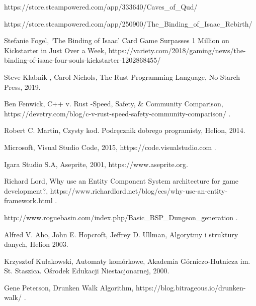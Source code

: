 \documentclass[12pt,twoside]{article}
\begin{document}
\begin{thebibliography}{4}
 https://store.steampowered.com/app/333640/Caves\_of\_Qud/


 https://store.steampowered.com/app/250900/The\_Binding\_of\_Isaac\_Rebirth/

 Stefanie Fogel, ‘The Binding of Isaac’ Card Game Surpasses 1 Million on Kickstarter in Just Over a Week, https://variety.com/2018/gaming/news/the-binding-of-isaac-four-souls-kickstarter-1202868455/


  Steve Klabnik , Carol Nichols, The Rust Programming Language, No Starch Press, 2019.

 Ben Fenwick, C++ v. Rust -Speed, Safety, \& Community Comparison, https://devetry.com/blog/c-v-rust-speed-safety-community-comparison/ .

 Robert C. Martin, Czysty kod. Podręcznik dobrego programisty, Helion, 2014.

 Microsoft, Visual Studio Code, 2015, https://code.visualstudio.com .

 Igara Studio S.A, Aseprite, 2001, https://www.aseprite.org.

 Richard Lord, Why use an Entity Component System architecture for game development?, https://www.richardlord.net/blog/ecs/why-use-an-entity-framework.html .

 http://www.roguebasin.com/index.php/Basic\_BSP\_Dungeon\_generation .

 Alfred V. Aho, John E. Hopcroft, Jeffrey D. Ullman, Algorytmy i struktury danych, Helion 2003.

 Krzysztof Kułakowski, Automaty komórkowe, Akademia Górniczo-Hutnicza im. St. Staszica. Ośrodek Edukacji Niestacjonarnej, 2000.

 Gene Peterson, Drunken Walk Algorithm, https://blog.bitrageous.io/drunken-walk/ .

\end{thebibliography}

\clearpage

\makesummary
\end{document}

